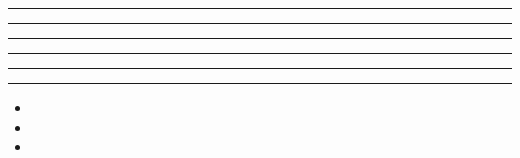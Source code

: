 \documentclass[11pt,a4paper]{article}
\begin{document}
\swarmwrapnext\lipsum[1]\lipsum[2]\lipsum[3]\lipsum[4]\lipsum[5]
\begin{swarmwrap}%
  \begin{minipage}[t]{3cm}
    \centering
    \textcolor{red!20}{\rule{\linewidth}{10cm}}
  \end{minipage}%
\end{swarmwrap}%
\swarmwrapnext\lipsum[1]\lipsum[2]\lipsum[3]\lipsum[4]\lipsum[5]\lipsum[6]
\begin{swarmwrap}%
  \begin{minipage}[t]{4cm}
    \centering
    \textcolor{red!20}{\rule{\linewidth}{2cm}}
  \end{minipage}%
\end{swarmwrap}%
\swarmwrapnext\lipsum[1]
\begin{swarmwrap}%
  \begin{minipage}[t]{5cm}
    \centering
    \textcolor{red!20}{\rule{\linewidth}{3cm}}
  \end{minipage}%
\end{swarmwrap}%
\swarmwrapnext\lipsum[1]\lipsum[2]
\begin{swarmwrap}%
  \begin{minipage}[t]{2cm}
    \centering
    \textcolor{red!20}{\rule{\linewidth}{4cm}}
  \end{minipage}%
\end{swarmwrap}%
\swarmwrapnext\lipsum[1]\lipsum[2]\lipsum[3]
\begin{swarmwrap}%
  \begin{minipage}[t]{3cm}
    \centering
    \textcolor{red!20}{\rule{\linewidth}{5cm}}
  \end{minipage}%
\end{swarmwrap}%
\swarmwrapnext\lipsum[1]\lipsum[2]\lipsum[3]\lipsum[4]
\begin{swarmwrap}%
  \begin{minipage}[t]{4cm}
    \centering
    \textcolor{green!30}{\rule{\linewidth}{6cm}}
  \end{minipage}%
\end{swarmwrap}%
\swarmwrapnext
\begin{itemize}
  \item \lipsum[1][1-3]
  \item \lipsum[2][1-3]
  \item \lipsum[3][1-3]
\end{itemize}
\end{document}
